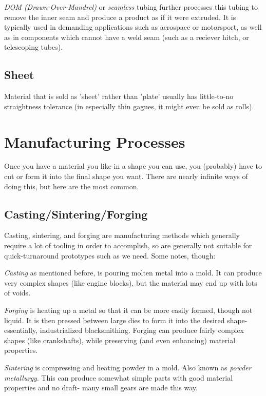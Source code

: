 \documentclass[10pt,letterpaper]{book}
\begin{document}
 \textit{DOM (Drawn-Over-Mandrel)} or \textit{seamless} tubing further processes this tubing to remove the inner seam and produce a product as if it were extruded. It is typically used in demanding applications such as aerospace or motorsport, as well as in components which cannot have a weld seam (such as a reciever hitch, or telescoping tubes).
 
 \subsection{Sheet}
 Material that is sold as 'sheet' rather than 'plate' usually has little-to-no straightness tolerance (in especially thin gagues, it might even be sold as rolls).
 
 \section{Manufacturing Processes}
 
 Once you have a material you like in a shape you can use, you (probably) have to cut or form it into the final shape you want. There are nearly infinite ways of doing this, but here are the most common.
 
 \subsection{Casting/Sintering/Forging}
 
 Casting, sintering, and forging are manufacturing methods which generally require a lot of tooling in order to accomplish, so are generally not suitable for quick-turnaround prototypes such as we need. Some notes, though:
 
 \begin{asparaitem}
 	\item \textit{Casting} as mentioned before, is pouring molten metal into a mold. It can produce very complex shapes (like engine blocks), but the material may end up with lots of voids.
 	\item \textit{Forging} is heating up a metal so that it can be more easily formed, though not liquid. It is then pressed between large dies to form it into the desired shape- essentially, industrialized blacksmithing. Forging can produce fairly complex shapes (like crankshafts), while preserving (and even enhancing) material properties.
 	\item \textit{Sintering} is compressing and heating powder in a mold. Also known as \textit{powder metallurgy}. This can produce somewhat simple parts with good material properties and no draft- many small gears are made this way.
 \end{asparaitem}
 
\end{document}
